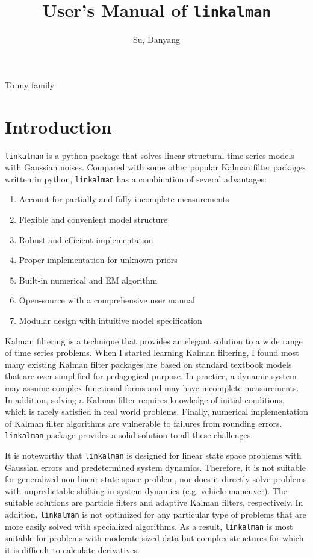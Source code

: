 \documentclass[10pt, titlepage]{article}
\title{User's Manual of \texttt{linkalman}}
\author{Su, Danyang}
\newenvironment{boenumerate}
    {\begin{enumerate}\renewcommand\labelenumi{\textbf\theenumi}}
    {\end{enumerate}}
\numberwithin{equation}{section}
\begin{document}
\maketitle
\thispagestyle{empty}
\newpage
{}
\thispagestyle{empty}
\centerline{To my family}
\clearpage
{}
\tableofcontents
\newpage
\section{Introduction}
\texttt{linkalman} is a python package that solves linear structural time series models with Gaussian noises. Compared with some other popular Kalman filter packages written in python, \texttt{linkalman} has a combination of several advantages:
\begin{boenumerate}
    \item Account for partially and fully incomplete measurements 
    \item Flexible and convenient model structure
    \item Robust and efficient implementation
    \item Proper implementation for unknown priors
    \item Built-in numerical and EM algorithm
    \item Open-source with a comprehensive user manual 
    \item Modular design with intuitive model specification
\end{boenumerate}
Kalman filtering is a technique that provides an elegant solution to a wide range of time series problems. When I started learning Kalman filtering, I found most many existing Kalman filter packages are based on standard textbook models that are over-simplified for pedagogical purpose. In practice, a dynamic system may assume complex functional forms and may have incomplete measurements. In addition, solving a Kalman filter requires knowledge of initial conditions, which is rarely satisfied in real world problems. Finally, numerical implementation of Kalman filter algorithms are vulnerable to failures from rounding errors. \texttt{linkalman} package provides a solid solution to all these challenges. 

It is noteworthy that \texttt{linkalman} is designed for linear state space problems with Gaussian errors and predetermined system dynamics. Therefore, it is not suitable for generalized non-linear state space problem, nor does it directly solve problems with unpredictable shifting in system dynamics (e.g. vehicle maneuver). The suitable solutions are particle filters and adaptive Kalman filters, respectively. In addition, \texttt{linkalman} is not optimized for any particular type of problems that are more easily solved with specialized algorithms. As a result, \texttt{linkalman} is most suitable for problems with moderate-sized data but complex structures for which it is difficult to calculate derivatives. 
\end{document}
